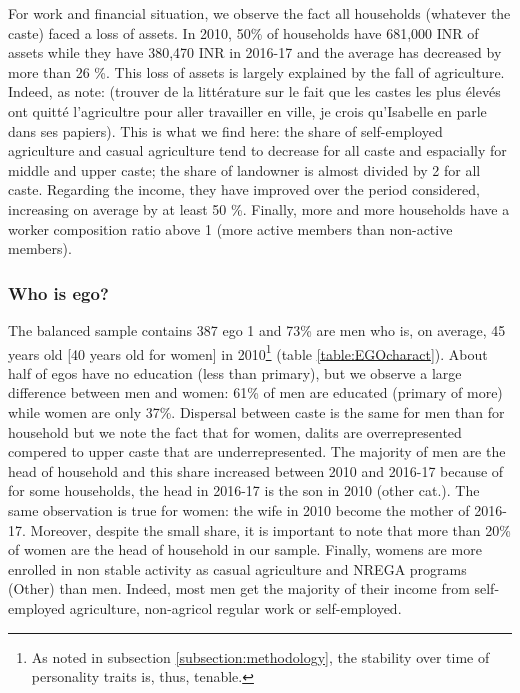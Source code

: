 \documentclass[a4paper, 11pt, onecolumn]{article}
\begin{document}
For work and financial situation, we observe the fact all households (whatever the caste) faced a loss of assets.
In 2010, 50\% of households have 681,000 INR of assets while they have 380,470 INR in 2016-17 and the average has decreased by more than 26 \%.
This loss of assets is largely explained by the fall of agriculture.
Indeed, as \cite{Guerin} note: (trouver de la littérature sur le fait que les castes les plus élevés ont quitté l'agricultre pour aller travailler en ville, je crois qu'Isabelle en parle dans ses papiers).
This is what we find here: the share of self-employed agriculture and casual agriculture tend to decrease for all caste and espacially for middle and upper caste; the share of landowner is almost divided by 2 for all caste.
Regarding the income, they have improved over the period considered, increasing on average by at least 50 \%.
Finally, more and more households have a worker composition ratio above 1 (more active members than non-active members).

		\subsubsection{Who is ego?}
		

The balanced sample contains 387 ego 1 and 73\% are men who is, on average, 45 years old [40 years old for women] in 2010\footnote{As noted in subsection \ref{subsection:methodology}, the stability over time of personality traits is, thus, tenable.} (table \ref{table:EGOcharact}).
About half of egos have no education (less than primary), but we observe a large difference between men and women: 61\% of men are educated (primary of more) while women are only 37\%.
Dispersal between caste is the same for men than for household but we note the fact that for women, dalits are overrepresented compered to upper caste that are underrepresented.
The majority of men are the head of household and this share increased between 2010 and 2016-17 because of for some households, the head in 2016-17 is the son in 2010 (other cat.).
The same observation is true for women: the wife in 2010 become the mother of 2016-17.
Moreover, despite the small share, it is important to note that more than 20\% of women are the head of household in our sample.
Finally, womens are more enrolled in non stable activity as casual agriculture and NREGA programs (Other) than men.
Indeed, most men get the majority of their income from self-employed agriculture, non-agricol regular work or self-employed.
\end{document}

